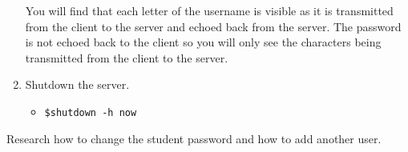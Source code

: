 \documentclass[11pt]{article}
\begin{document}
\begin{enumerate}
        \begin{tcolorbox}[colback=blue!20]
            You will find that each letter of the username is visible as it is transmitted from the client to the server and echoed back from the server.
            The password is not echoed back to the client so you will only see the characters being transmitted from the client to the server.
        \end{tcolorbox}
    \item Shutdown the server.
        \begin{itemize}
            \item \texttt{\$shutdown -h now}
        \end{itemize}
    \end{enumerate}
    \begin{tcolorbox}[colback=blue!20,title={\textbf{TIME PERMITTING:}}]
        Research how to change the student password and how to add another user.
    \end{tcolorbox}
\end{document}
